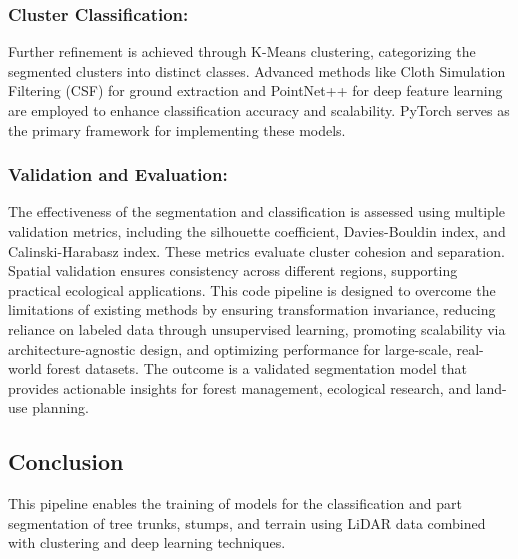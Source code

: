 \documentclass[../report.tex]{subfiles}
\begin{document}
\subsubsection{Cluster Classification:}
Further refinement is achieved through K-Means clustering, categorizing the segmented clusters into distinct classes. Advanced methods like Cloth Simulation Filtering (CSF) for ground extraction and PointNet++ for deep feature learning are employed to enhance classification accuracy and scalability. PyTorch serves as the primary framework for implementing these models.\cite{ClothSF}\cite{PointNet++}
\subsubsection{Validation and Evaluation:}
The effectiveness of the segmentation and classification is assessed using multiple validation metrics, including the silhouette coefficient, Davies-Bouldin index, and Calinski-Harabasz index. These metrics evaluate cluster cohesion and separation. Spatial validation ensures consistency across different regions, supporting practical ecological applications.\cite{Davies-Bouldin}\cite{Calinski}
This code pipeline is designed to overcome the limitations of existing methods by ensuring transformation invariance, reducing reliance on labeled data through unsupervised learning, promoting scalability via architecture-agnostic design, and optimizing performance for large-scale, real-world forest datasets. The outcome is a validated segmentation model that provides actionable insights for forest management, ecological research, and land-use planning.

\subsection{Conclusion}
This pipeline enables the training of models for the classification and part segmentation of tree trunks, stumps, and terrain using LiDAR data combined with clustering and deep learning techniques.
\end{document}
